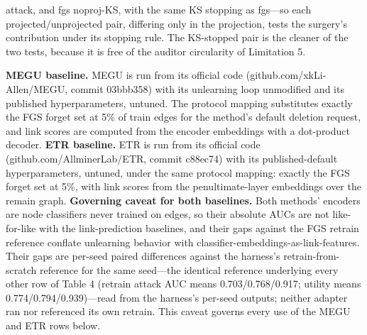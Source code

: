 \documentclass[pdflatex,sn-basic,Numbered]{sn-jnl}
\begin{document}
attack, and fgs noproj-KS, with the same KS stopping as fgs---so each projected/unprojected pair, differing only in the projection, tests the surgery's contribution under its stopping rule. The KS-stopped pair is the cleaner of the two tests, because it is free of the auditor circularity of Limitation 5.

\textbf{MEGU baseline.} MEGU \cite{megu2024} is run from its official code (github.com/xkLi-Allen/MEGU, commit 03bbb358) with its unlearning loop unmodified and its published hyperparameters, untuned. The protocol mapping substitutes exactly the FGS forget set at 5\% of train edges for the method's default deletion request, and link scores are computed from the encoder embeddings with a dot-product decoder. \textbf{ETR baseline.} ETR \cite{etr2024} is run from its official code (github.com/AllminerLab/ETR, commit c88ec74) with its published-default hyperparameters, untuned, under the same protocol mapping: exactly the FGS forget set at 5\%, with link scores from the penultimate-layer embeddings over the remain graph. \textbf{Governing caveat for both baselines.} Both methods' encoders are node classifiers never trained on edges, so their absolute AUCs are not like-for-like with the link-prediction baselines, and their gaps against the FGS retrain reference conflate unlearning behavior with classifier-embeddings-as-link-features. Their gaps are per-seed paired differences against the harness's retrain-from-scratch reference for the same seed---the identical reference underlying every other row of Table 4 (retrain attack AUC means 0.703/0.768/0.917; utility means 0.774/0.794/0.939)---read from the harness's per-seed outputs; neither adapter ran nor referenced its own retrain. This caveat governs every use of the MEGU and ETR rows below.
\end{document}
